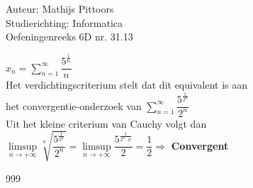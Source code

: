 \documentclass[a4paper]{article}
\begin{document}
  
\noindent \large Auteur: Mathijs Pittoors \\
\noindent \large Studierichting: Informatica\\
\noindent \large Oefeningenreeks 6D nr. 31.13\\

\medskip

\normalsize

$x_n = \displaystyle\sum_{n=1}^{\infty} \dfrac{5^{\tfrac{1}{n}}}{n}$\\

Het verdichtingscriterium stelt dat dit equivalent is aan\\

het convergentie-onderzoek van $\displaystyle\sum_{n=1}^{\infty} \dfrac{5^{\tfrac{1}{2^n}}}{2^n}$\\

Uit het kleine criterium van Cauchy volgt dan\\

$\limsup\limits_{n\rightarrow +\infty} \sqrt[n]{\dfrac{5^{\tfrac{1}{2^n}}}{2^n}} = \limsup\limits_{n\rightarrow +\infty} \dfrac{5^{\tfrac{1}{2^n \cdot n}}}{2} = \dfrac{1}{2} \Rightarrow$ \textbf{Convergent}

\begin{thebibliography}{999}
\end{thebibliography}
\end{document}

